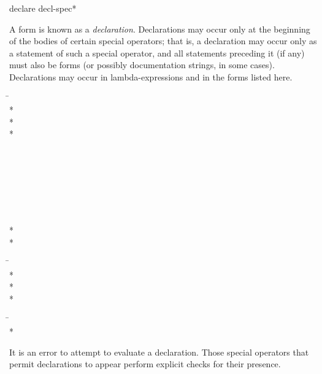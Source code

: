 \begin{defspec}
declare {decl-spec}*

A  form is known as a \emph{declaration}.
Declarations may occur only at the beginning of the bodies of
certain special operators;
that is, a declaration may occur only as a statement
of such a special operator, and all statements preceding it (if any) must
also be  forms (or possibly documentation strings, in some cases).
Declarations may occur in lambda-expressions and in the forms listed here.
\begin{lisp}
\hskip 12pc\=\kill
{}\> \\*
\> \\*
\> \\*
\> \\
\> \\
\> \\
\> \\
\> \\
\> \\
\> \\
\> \\*
\> \\*
\> \\
\>
\end{lisp}
 
\begin{lisp}
\hskip 12pc\=\kill
{}\> \\*
\> \\*
\> \\*
\end{lisp}

\begin{lisp}
\hskip 12pc\=\kill
{}\> \\*
\end{lisp}

It is an error to attempt to evaluate a declaration.
Those special operators that permit declarations to appear
perform explicit checks for their presence.


\end{defspec}
